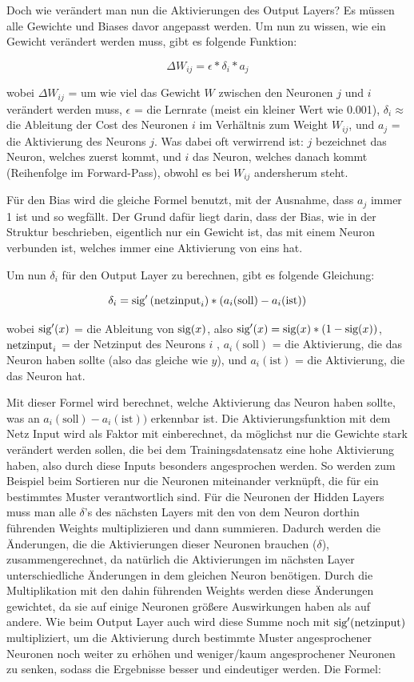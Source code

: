 \documentclass{scrartcl}
\begin{document}

	Doch wie verändert man nun die Aktivierungen des Output Layers? Es müssen alle Gewichte und Biases davor angepasst werden. Um nun zu wissen, wie ein Gewicht verändert werden muss, gibt es folgende Funktion:

	{\Large \[
		\Delta W_{ij} = \epsilon * \delta_i * a_j
	\]}

	wobei $\Delta W_{ij}$ = um wie viel das Gewicht $W$ zwischen den Neuronen $j$ und $i$ verändert werden muss, $\epsilon$ = die Lernrate (meist ein kleiner Wert wie 0.001), $\delta_i \approx$ die Ableitung der Cost des Neuronen $i$ im Verhältnis zum Weight $W_{ij}$, und $a_j$ = die Aktivierung des Neurons $j$. Was dabei oft verwirrend ist: $j$ bezeichnet das Neuron, welches zuerst kommt, und $i$ das Neuron, welches danach kommt (Reihenfolge im Forward-Pass), obwohl es bei $W_{ij}$ andersherum steht.

	Für den Bias wird die gleiche Formel benutzt, mit der Ausnahme, dass $a_j$ immer 1 ist und so wegfällt. Der Grund dafür liegt darin, dass der Bias, wie in der Struktur beschrieben, eigentlich nur ein Gewicht ist, das mit einem Neuron verbunden ist, welches immer eine Aktivierung von eins hat.

	Um nun $\delta_i$ für den Output Layer zu berechnen, gibt es folgende Gleichung: 

	{\Large \[
		\delta_i = \textrm{sig} '\left({\textrm{netzinput}}_i\right) * (a_i (\textrm{soll}) - a_i (\textrm{ist})) 
	\]}

	wobei $\textrm{sig} '(x)$ = die Ableitung von $\textrm{sig}(x)$, also $\textrm{sig}'(x) = \textrm{sig}(x) * (1 - \textrm{sig}(x))$, $\textrm{netzinput}_i$ = der Netzinput des Neurons $i$ , $a_i(\textrm{soll})$ = die Aktivierung, die das Neuron haben sollte (also das gleiche wie $y$), und $a_i(\textrm{ist})$ = die Aktivierung, die das Neuron hat.

	Mit dieser Formel wird berechnet, welche Aktivierung das Neuron haben sollte, was an $a_i(\textrm{soll}) - a_i(\textrm{ist}))$ erkennbar ist. Die Aktivierungsfunktion mit dem Netz Input wird als Faktor mit einberechnet, da möglichst nur die Gewichte stark verändert werden sollen, die bei dem Trainingsdatensatz eine hohe Aktivierung haben, also durch diese Inputs besonders angesprochen werden. So werden zum Beispiel beim Sortieren nur die Neuronen miteinander verknüpft, die für ein bestimmtes Muster verantwortlich sind. Für die Neuronen der Hidden Layers muss man alle $\delta$'s des nächsten Layers mit den von dem Neuron dorthin führenden Weights multiplizieren und dann summieren. Dadurch werden die Änderungen, die die Aktivierungen dieser Neuronen brauchen ($\delta$), zusammengerechnet, da natürlich die Aktivierungen im nächsten Layer unterschiedliche Änderungen in dem gleichen Neuron benötigen. Durch die Multiplikation mit den dahin führenden Weights werden diese Änderungen gewichtet, da sie auf einige Neuronen größere Auswirkungen haben als auf andere. Wie beim Output Layer auch wird diese Summe noch mit $\textrm{sig}'(\textrm{netzinput})$ multipliziert, um die Aktivierung durch bestimmte Muster angesprochener Neuronen noch weiter zu erhöhen und weniger/kaum angesprochener Neuronen zu senken, sodass die Ergebnisse besser und eindeutiger werden. Die Formel:
\end{document}
